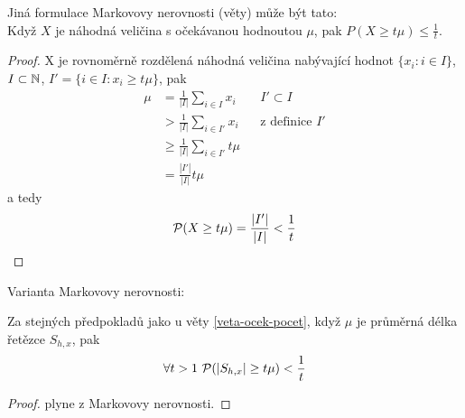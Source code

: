 \begin{pozn}
Jiná formulace Markovovy nerovnosti (věty) může být tato: \\
Když $X$ je náhodná veličina s očekávanou hodnoutou $\mu$, pak 
$P(X \geq t \mu) \leq \frac{1}{t}$.
\end{pozn}

\begin{proof}                                                                   
X je rovnoměrně rozdělená náhodná veličina nabývající hodnot $\{x_i : i
\in     
I \}$, $I \subset \Bbb N$,                                                      
$I' = \{ i \in I : x_i \geq t \mu \}$, pak                                      
\begin{align*}                                                                  
\mu                                                                             
&= \frac 1{|I|} \sum_{i \in I} x_i                                              
    && I' \subset I\\                                                           
& > \frac 1{|I|} \sum_{i \in I'} x_i                                            
    && \text{z definice } I'\\                                                  
& \geq \frac 1{|I|} \sum_{i \in I'} t \mu\\                                     
& = \frac {|I'|}{|I|} t \mu                                                     
\end{align*}                                                                    
a tedy                                                                          
\[                                                                              
{\cal P}(X \geq t \mu) =  \frac {|I'|}{|I|} < \frac 1t                               
\]                                                                              
\end{proof}

Varianta Markovovy nerovnosti:
\begin{theorem}
Za stejných předpokladů jako u 
věty \ref{veta-ocek-pocet}, když $\mu$ je průměrná
délka řetězce $S_{h,x}$, pak 
\[
\forall t > 1\ 
 \pr(|S_{h,x}| \geq t \mu)
 < \frac 1t
\]
\end{theorem}

\begin{proof}
plyne z Markovovy nerovnosti.

%
%
\end{proof}


